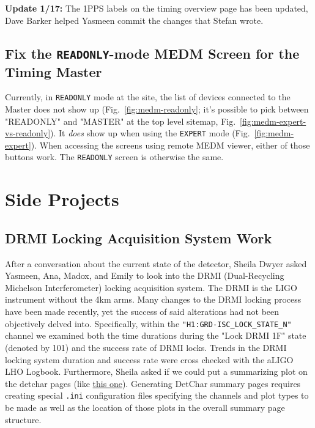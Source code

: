\documentclass{article}
\newcommand*{\TODO}{\textcolor{todo}}
\begin{document}
\textbf{Update 1/17:} The 1PPS labels on the timing overview page has been updated, Dave Barker helped Yasmeen commit the changes that Stefan wrote. 

\subsection{\label{sec:fix-local-medm-readonly}Fix the \texttt{READONLY}-mode MEDM Screen for the Timing Master}

Currently, in \texttt{READONLY} mode at the site, the list of devices connected to the Master does not show up (Fig.~\ref{fig:medm-readonly}; it's possible to pick between "READONLY" and "MASTER" at the top level sitemap, Fig.~\ref{fig:medm-expert-vs-readonly}). It \textit{does} show up when using the \texttt{EXPERT} mode (Fig.~\ref{fig:medm-expert}). When accessing the screens using remote MEDM viewer, either of those buttons work. The \texttt{READONLY} screen is otherwise the same. 

\section{Side Projects}

\TODO{\subsection{DRMI Locking Acquisition System Work}}

After a conversation about the current state of the detector, Sheila Dwyer asked Yasmeen, Ana, Madox, and Emily to look into the DRMI (Dual-Recycling Michelson Interferometer) locking acquisition system. The DRMI is the LIGO instrument without the 4km arms. Many changes to the DRMI locking process have been made recently, yet the success of said alterations had not been objectively delved into. Specifically, within the \texttt{"H1:GRD-ISC\_LOCK\_STATE\_N"} channel we examined both the time durations during the "Lock DRMI 1F" state (denoted by 101) and the success rate of DRMI locks. Trends in the DRMI locking system duration and success rate were cross checked with the aLIGO LHO Logbook. Furthermore, Sheila asked if we could put a summarizing plot on the detchar pages (like \href{https://ldas-jobs.ligo.caltech.edu/~detchar/summary/day/20190111/psl/}{this one}). Generating DetChar summary pages requires creating special \texttt{.ini} configuration files specifying the channels and plot types to be made as well as the location of those plots in the overall summary page structure.
\end{document}
